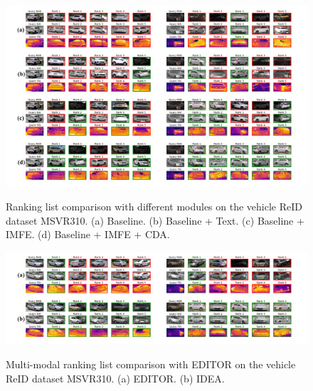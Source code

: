\begin{figure}[t]
  \centering
    \resizebox{0.94\textwidth}{!}
    {
  \includegraphics[width=30.\linewidth]{sec/supp_img/Rank_Vehicle.pdf}
  }
  \vspace{-2mm}
   \caption{Ranking list comparison with different modules on the vehicle ReID dataset MSVR310.
   (a) Baseline.
   (b) Baseline + Text.
   (c) Baseline + IMFE.
   (d) Baseline + IMFE + CDA.}
  \label{fig:rank_vehicle_modules}
  \vspace{-2mm}
\end{figure}
\begin{figure}[t]
  \centering
    \resizebox{0.94\textwidth}{!}
    {
  \includegraphics[width=30.\linewidth]{sec/supp_img/Rank_Vehicle_EDITOR.pdf}
  }
  \vspace{-2mm}
   \caption{Multi-modal ranking list comparison with EDITOR on the vehicle ReID dataset MSVR310.
   (a) EDITOR.
    (b) IDEA.}
  \label{fig:rank_EDITOR}
  \vspace{-2mm}
\end{figure}
